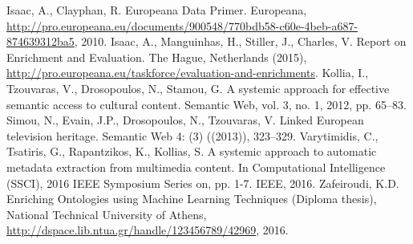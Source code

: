\documentclass[runningheads,a4paper]{llncs}
\begin{document}
\begin{thebibliography}{4}

 Isaac, A., Clayphan, R. Europeana Data Primer. Europeana, \url{http://pro.europeana.eu/documents/900548/770bdb58-c60e-4beb-a687-874639312ba5}, 2010.
 Isaac, A., Manguinhas, H., Stiller, J., Charles, V. Report on Enrichment and Evaluation. The Hague, Netherlands (2015), \url{http://pro.europeana.eu/taskforce/evaluation-and-enrichments}.
 Kollia, I., Tzouvaras, V., Drosopoulos, N., Stamou, G. A systemic approach for effective semantic access to cultural content. Semantic Web, vol. 3, no. 1, 2012, pp. 65--83.
 Simou, N., Evain, J.P., Drosopoulos, N., Tzouvaras, V. Linked European television heritage. Semantic Web 4: (3) ((2013)), 323--329.
 Varytimidis, C., Tsatiris, G., Rapantzikos, K., Kollias, S. A systemic approach to automatic metadata extraction from multimedia content. In Computational Intelligence (SSCI), 2016 IEEE Symposium Series on, pp. 1-7. IEEE, 2016.
 Zafeiroudi, K.D. Enriching Ontologies using Machine Learning Techniques (Diploma thesis), National Technical University of Athens, \url{http://dspace.lib.ntua.gr/handle/123456789/42969}, 2016. 

\end{thebibliography}
\end{document}

